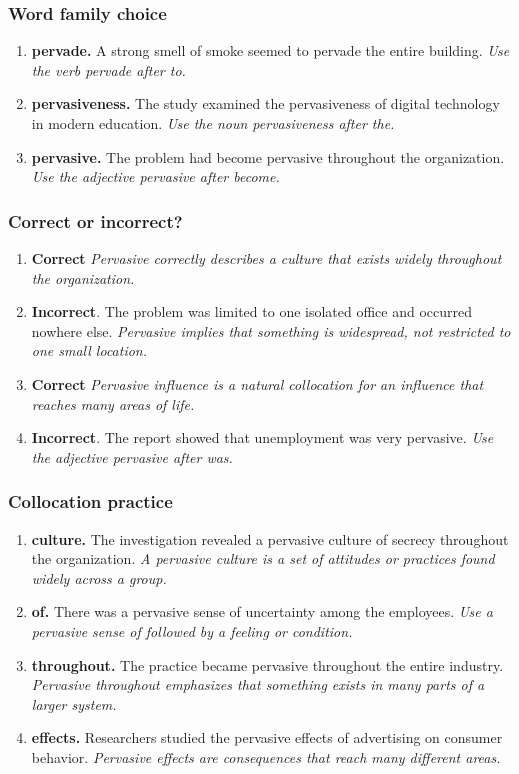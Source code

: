 \documentclass[11pt]{article}
\begin{document}
\subsubsection{Word family choice}
\begin{enumerate}
  \item \textbf{pervade.} A strong smell of smoke seemed to pervade the entire building. \emph{Use the verb pervade after to.}
  \item \textbf{pervasiveness.} The study examined the pervasiveness of digital technology in modern education. \emph{Use the noun pervasiveness after the.}
  \item \textbf{pervasive.} The problem had become pervasive throughout the organization. \emph{Use the adjective pervasive after become.}
\end{enumerate}

\subsubsection{Correct or incorrect?}
\begin{enumerate}
  \item \textbf{Correct} \emph{Pervasive correctly describes a culture that exists widely throughout the organization.}
  \item \textbf{Incorrect}. The problem was limited to one isolated office and occurred nowhere else. \emph{Pervasive implies that something is widespread, not restricted to one small location.}
  \item \textbf{Correct} \emph{Pervasive influence is a natural collocation for an influence that reaches many areas of life.}
  \item \textbf{Incorrect}. The report showed that unemployment was very pervasive. \emph{Use the adjective pervasive after was.}
\end{enumerate}

\subsubsection{Collocation practice}
\begin{enumerate}
  \item \textbf{culture.} The investigation revealed a pervasive culture of secrecy throughout the organization. \emph{A pervasive culture is a set of attitudes or practices found widely across a group.}
  \item \textbf{of.} There was a pervasive sense of uncertainty among the employees. \emph{Use a pervasive sense of followed by a feeling or condition.}
  \item \textbf{throughout.} The practice became pervasive throughout the entire industry. \emph{Pervasive throughout emphasizes that something exists in many parts of a larger system.}
  \item \textbf{effects.} Researchers studied the pervasive effects of advertising on consumer behavior. \emph{Pervasive effects are consequences that reach many different areas.}
\end{enumerate}
\end{document}
